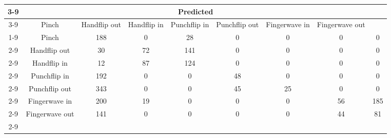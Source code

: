 \documentclass{standalone}
\begin{document}
 
 \begin{tabular}{|c |c |c |c |c |c |c |c |c |}
\cline{3-9}\multicolumn{2}{c|}{} & \multicolumn{7}{c|}{Predicted} \\ 
\cline{3-9} \multicolumn{2}{c |}{ } & Pinch & Handflip out & Handflip in & Punchflip in & Punchflip out & Fingerwave in & Fingerwave out\\ 
\cline{1-9}\multirow{7}{*}{\rotatebox[origin=c]{90}{Actual}} & Pinch & 188 & 0 & 28 & 0 & 0 & 0 & 0\\ 
 \cline{2-9} & Handflip out & 30 & 72 & 141 & 0 & 0 & 0 & 0\\ 
 \cline{2-9} & Handflip in & 12 & 87 & 124 & 0 & 0 & 0 & 0\\ 
 \cline{2-9} & Punchflip in & 192 & 0 & 0 & 48 & 0 & 0 & 0\\ 
 \cline{2-9} & Punchflip out & 343 & 0 & 0 & 45 & 25 & 0 & 0\\ 
 \cline{2-9} & Fingerwave in & 200 & 19 & 0 & 0 & 0 & 56 & 185\\ 
 \cline{2-9} & Fingerwave out & 141 & 0 & 0 & 0 & 0 & 44 & 81\\ 
 \cline{2-9}\hline \end{tabular}
 
\end{document}
